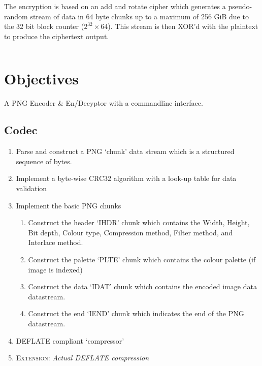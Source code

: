 \documentclass{article}
\begin{document}
The encryption is based on an add and rotate cipher which generates a pseudo-random stream of data in 64 byte chunks up to a maximum of 256 GiB due to the 32 bit block counter (${2^{32}}\times64$). This stream is then XOR'd with the plaintext to produce the ciphertext output.

\inputminted[linenos,breaklines,fontsize=\small]{c}{prototype.c}

\section{Objectives}

A PNG Encoder \& En/Decyptor with a commandline interface.

\subsection{Codec}
\begin{enumerate}
    \item Parse and construct a PNG `chunk' data stream which is a structured sequence of bytes.
    \item Implement a byte-wise CRC32 algorithm with a look-up table for data validation
    \item Implement the basic PNG chunks
    \begin{enumerate}
        \item Construct the header `IHDR' chunk which contains the Width, Height, Bit depth, Colour type, Compression method, Filter method, and Interlace method.
        \item Construct the palette `PLTE' chunk which contains the colour palette (if image is indexed)
        \item Construct the data `IDAT' chunk which contains the encoded image data datastream.
        \item Construct the end `IEND' chunk which indicates the end of the PNG datastream.
    \end{enumerate}
    \item DEFLATE compliant `compressor'
    \item \textsc{Extension:} \textit{Actual DEFLATE compression}
\end{enumerate}
\end{document}

